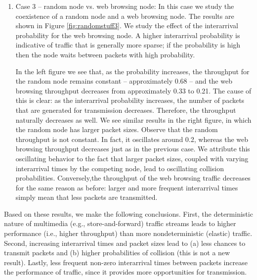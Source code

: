 \documentclass{llncs}
\begin{document}
\begin{enumerate}
	\item Case 3 -- random node vs. web browsing node: In this case we study the coexistence of a random node and a web browsing node. The results are shown in Figure \ref{fig:randomstuff3}. We study the effect of the interarrival probability for the web browsing node. A higher interarrival probability is indicative of traffic that is generally more sparse; if the probability is high then the node waits between packets with high probability. 

	In the left figure we see that, as the probability increases, the throughput for the random node remains constant -- approximately 0.68 -- and the web browsing throughput decreases from approximately 0.33 to 0.21. The cause of this is clear: as the interarrival probability increases, the number of packets that are generated for transmission decreases. Therefore, the throughput naturally decreases as well. We see similar results in the right figure, in which the random node has larger packet sizes. Observe that the random throughput is not constant. In fact, it oscillates around 0.2, whereas the web browsing throughput decreases just as in the previous case. We attribute this oscillating behavior to the fact that larger packet sizes, coupled with varying interarrival times by the competing node, lead to oscillating collision probabilities. Conversely,the throughput of the web browsing traffic decreases for the same reason as before: larger and more frequent interarrival times simply mean that less packets are transmitted.
\end{enumerate}

Based on these results, we make the following conclusions. First, the deterministic nature of multimedia (e.g., store-and-forward) traffic streams leads to higher performance (i.e., higher throughput) than more nondeterministic (elastic) traffic. Second, increasing interarrival times and packet sizes lead to (a) less chances to transmit packets and (b) higher probabilities of collision (this is not a new result). Lastly, less frequent non-zero interarrival times between packets increase the performance of traffic, since it provides more opportunities for transmission.


\end{document}
